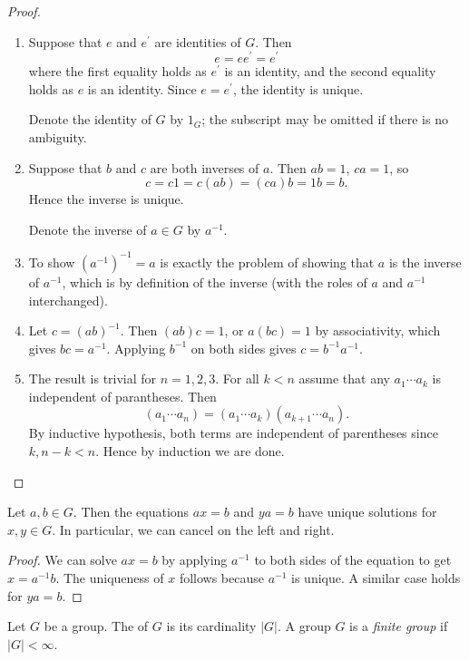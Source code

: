 \begin{proof} \
\begin{enumerate}[label=(\roman*)]
\item Suppose that $e$ and $e^\prime$ are identities of $G$. Then
\[e=ee^\prime=e^\prime\]
where the first equality holds as $e^\prime$ is an identity, and the second equality holds as $e$ is an identity. Since $e=e^\prime$, the identity is unique.
\begin{notation}
Denote the identity of $G$ by $1_G$; the subscript may be omitted if there is no ambiguity. 
\end{notation}
\item Suppose that $b$ and $c$ are both inverses of $a$. Then $ab=1$, $ca=1$, so
\[c=c1=c(ab)=(ca)b=1b=b.\]
Hence the inverse is unique.
\begin{notation}
Denote the inverse of $a\in G$ by $a^{-1}$.
\end{notation}
\item To show $(a^{-1})^{-1}=a$ is exactly the problem of showing that $a$ is the inverse of $a^{-1}$, which is by definition of the inverse (with the roles of $a$ and $a^{-1}$ interchanged).
\item Let $c=(ab)^{-1}$. Then $(ab)c=1$, or $a(bc)=1$ by associativity, which gives $bc=a^{-1}$. Applying $b^{-1}$ on both sides gives $c=b^{-1}a^{-1}$.
\item The result is trivial for $n=1,2,3$. For all $k<n$ assume that any $a_1\cdots a_k$ is independent of parantheses. Then
\[(a_1\cdots a_n)=(a_1\cdots a_k)(a_{k+1}\cdots a_n).\]
By inductive hypothesis, both terms are independent of parentheses since $k,n-k<n$. Hence by induction we are done.
\end{enumerate}
\end{proof}

\begin{proposition}
Let $a,b\in G$. Then the equations $ax=b$ and $ya=b$ have unique solutions for $x,y\in G$. In particular, we can cancel on the left and right.
\end{proposition}

\begin{proof}
We can solve $ax=b$ by applying $a^{-1}$ to both sides of the equation to get $x=a^{-1}b$. The uniqueness of $x$ follows because $a^{-1}$ is unique. A similar case holds for $ya=b$.
\end{proof}

\begin{definition}
Let $G$ be a group. The  of $G$ is its cardinality $|G|$. A group $G$ is a \emph{finite group} if $|G|<\infty$.
\end{definition}

